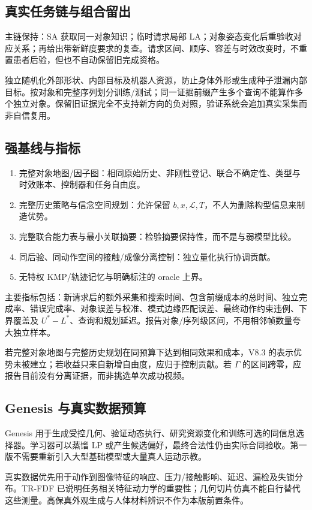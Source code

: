 \documentclass[UTF8,11pt,a4paper,fontset=fandol]{ctexart}
\numberwithin{equation}{section}
\theoremstyle{definition}
\begin{document}
\subsection{真实任务链与组合留出}
主链保持：SA 获取同一对象知识；临时请求局部 LA；对象姿态变化后重验收对应关系；再给出带新鲜度要求的复查。请求区间、顺序、容差与时效改变时，不重置患者后验，但也不自动保留旧完成资格。

独立随机化外部形状、内部目标及机器人资源，防止身体外形或生成种子泄漏内部目标。按对象和完整序列划分训练/测试；同一证据前缀产生多个查询不能算作多个独立对象。保留旧证据完全不支持新方向的负对照，验证系统会追加真实采集而非自信复用。

\subsection{强基线与指标}
\begin{enumerate}
\item 完整对象地图/因子图：相同原始历史、非刚性登记、联合不确定性、类型与时效账本、控制器和任务自由度。
\item 完整历史策略与信念空间规划：允许保留 $b,x,\mathcal L,T$，不人为删除构型信息来制造优势。
\item 完整联合能力表与最小关联摘要：检验摘要保持性，而不是与弱模型比较。
\item 同后验、同动作空间的接触/成像分离控制：独立量化执行协调贡献。
\item 无特权 KMP/轨迹记忆与明确标注的 oracle 上界。
\end{enumerate}
主要指标包括：新请求后的额外采集和搜索时间、包含前缀成本的总时间、独立完成率、错误完成率、对象误差与校准、模式边缘匹配误差、最终动作约束违例、下界覆盖及 $U^*-L^*$、查询和规划延迟。报告对象/序列级区间，不用相邻帧数量夸大独立样本。

若完整对象地图与完整历史规划在同预算下达到相同效果和成本，V8.3 的表示优势未被建立；若收益只来自新增自由度，应归于控制贡献。若 $\Gamma$ 的区间跨零，应报告目前没有分离证据，而非挑选单次成功视频。

\subsection{Genesis 与真实数据预算}
Genesis 用于生成受控几何、验证动态执行、研究资源变化和训练可选的同信息选择器。学习器可以蒸馏 LP 或产生候选偏好，最终合法性仍由实际合同验收。第一版不需要重新引入大型基础模型或大量真人运动示教。

真实数据优先用于动作到图像特征的响应、压力/接触影响、延迟、漏检及失锁分布。TR-FDF 已说明任务相关特征动力学的重要性\cite{trfdf}；几何切片仿真不能自行替代这些测量。高保真外观生成与人体材料辨识不作为本版前置条件。
\end{document}
